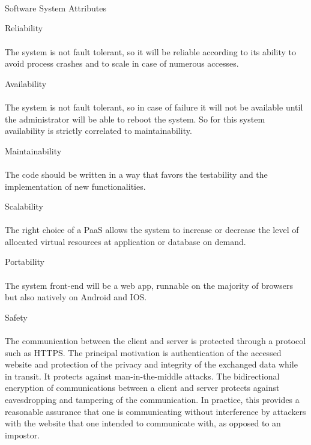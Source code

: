 \documentclass{article}
\begin{document}
\begin{legal}
\begin{legal}
\begin{legal}
\begin{tabular}{| m{3.5cm} | m{8cm}| }
				\hline
				\end{tabular}
				\\\\\\
    		\end{legal}
    		\item Software System Attributes \\
		\begin{legal}\bfseries
			\item Reliability
			\\\\
			{\normalfont The system is not fault tolerant, so it will be reliable according to its ability to avoid process crashes and to scale in case of numerous accesses.}
			\\
			\item Availability
			\\\\
			{\normalfont The system is not fault tolerant, so in case of failure it will not be available until the administrator will be able to reboot the system. So for this system availability is strictly correlated to maintainability.}
			\\
			\item Maintainability
			\\\\
			{\normalfont The code should be written in a way that favors the testability and the implementation of new functionalities.}
			\\
			\item Scalability
			\\\\
			{\normalfont The right choice of a PaaS allows the system to increase or decrease the level of allocated virtual resources at application or database on demand.}
			\\
			\item Portability
			\\\\
			{\normalfont The system front-end will be a web app, runnable on the majority of browsers but also natively on Android and IOS.}
			\\
			\item Safety
			\\\\
			{\normalfont The communication between the client and server is protected through a protocol such as HTTPS. The principal motivation is authentication of the accessed website and protection of the privacy and integrity of the exchanged data while in transit. It protects against man-in-the-middle attacks. The bidirectional encryption of communications between a client and server protects against eavesdropping and tampering of the communication. In practice, this provides a reasonable assurance that one is communicating without interference by attackers with the website that one intended to communicate with, as opposed to an impostor. }
			\\
			

\end{legal}
\end{legal}
\end{legal}
\end{document}
